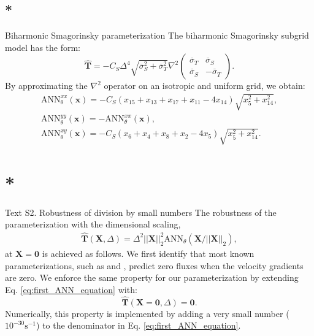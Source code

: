 \documentclass[draft,grl]{agutexSI2019}
\begin{document}
\begin{article}
\subsection{*}{Biharmonic Smagorinsky parameterization} The biharmonic Smagorinsky subgrid model has the form:
\begin{equation}
    \widehat{\mathbf{T}} =   -C_S \Delta^4 \sqrt{\overline{\sigma}_S^2 + \overline{\sigma}_T^2} 
    \nabla^2
    \begin{pmatrix}
     \overline{\sigma}_T & \overline{\sigma}_S \\
    \overline{\sigma}_S & -\overline{\sigma}_T
    \end{pmatrix}.
\end{equation}
By approximating the $\nabla^2$ operator on an isotropic and uniform grid, we obtain:
\begin{gather}
    \mathrm{ANN}_{\theta}^{xx}(\mathbf{x}) = - C_S (x_{15} + x_{13} + x_{17} + x_{11}-4x_{14}) \sqrt{x_5^2 + x_{14}^2}, \\
        \mathrm{ANN}_{\theta}^{yy}(\mathbf{x}) = -\mathrm{ANN}_{\theta}^{xx}(\mathbf{x}), \\
      \mathrm{ANN}_{\theta}^{xy}(\mathbf{x}) = - C_S (x_{6} + x_{4} + x_{8} + x_{2}-4x_{5}) \sqrt{x_5^2 + x_{14}^2}.
\end{gather}

\section{*}{Text S2. Robustness of division by small numbers}
The robustness of the  parameterization with the dimensional scaling, 
\begin{gather}
    \widehat{\mathbf{T}}(\mathbf{X}, \Delta) = \Delta^2 ||\mathbf{X}||_2^2 \mathrm{ANN}_{\theta} (\mathbf{X} / ||\mathbf{X}||_2), \label{eq:first_ANN_equation}
\end{gather}
at $\mathbf{X}=\mathbf{0}$ is achieved as follows. We first identify that most known parameterizations, such as  and , predict zero fluxes when the velocity gradients are zero. We enforce the same property for our parameterization by extending Eq. \eqref{eq:first_ANN_equation} with:
\begin{equation}
    \widehat{\mathbf{T}}(\mathbf{X}=\mathbf{0}, \Delta)=\mathbf{0}.
\end{equation}
Numerically, this property is implemented by adding a very small number ($10^{-30}\mathrm{s}^{-1}$) to the denominator in Eq. \eqref{eq:first_ANN_equation}. 


\end{article}
\end{document}
